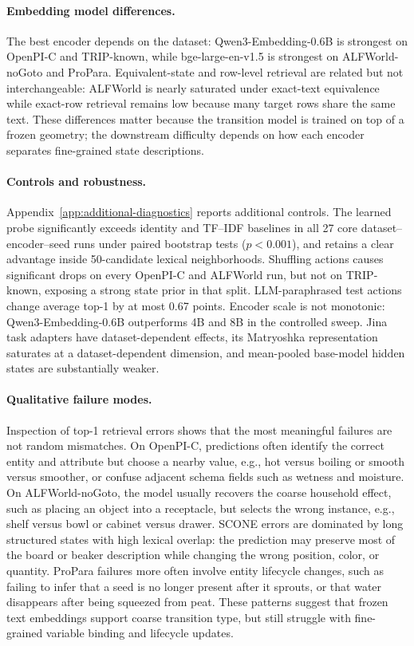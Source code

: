 \documentclass{article}
\begin{document}
\paragraph{Embedding model differences.}
The best encoder depends on the dataset: Qwen3-Embedding-0.6B is strongest on OpenPI-C and TRIP-known, while bge-large-en-v1.5 is strongest on ALFWorld-noGoto and ProPara. Equivalent-state and row-level retrieval are related but not interchangeable: ALFWorld is nearly saturated under exact-text equivalence while exact-row retrieval remains low because many target rows share the same text. These differences matter because the transition model is trained on top of a frozen geometry; the downstream difficulty depends on how each encoder separates fine-grained state descriptions.

\paragraph{Controls and robustness.}
Appendix~\ref{app:additional-diagnostics} reports additional controls. The learned probe significantly exceeds identity and TF--IDF baselines in all 27 core dataset--encoder--seed runs under paired bootstrap tests ($p<0.001$), and retains a clear advantage inside 50-candidate lexical neighborhoods. Shuffling actions causes significant drops on every OpenPI-C and ALFWorld run, but not on TRIP-known, exposing a strong state prior in that split. LLM-paraphrased test actions change average top-1 by at most 0.67 points. Encoder scale is not monotonic: Qwen3-Embedding-0.6B outperforms 4B and 8B in the controlled sweep. Jina task adapters have dataset-dependent effects, its Matryoshka representation saturates at a dataset-dependent dimension, and mean-pooled base-model hidden states are substantially weaker.

\paragraph{Qualitative failure modes.}
Inspection of top-1 retrieval errors shows that the most meaningful failures are not random mismatches. On OpenPI-C, predictions often identify the correct entity and attribute but choose a nearby value, e.g., hot versus boiling or smooth versus smoother, or confuse adjacent schema fields such as wetness and moisture. On ALFWorld-noGoto, the model usually recovers the coarse household effect, such as placing an object into a receptacle, but selects the wrong instance, e.g., shelf versus bowl or cabinet versus drawer. SCONE errors are dominated by long structured states with high lexical overlap: the prediction may preserve most of the board or beaker description while changing the wrong position, color, or quantity. ProPara failures more often involve entity lifecycle changes, such as failing to infer that a seed is no longer present after it sprouts, or that water disappears after being squeezed from peat. These patterns suggest that frozen text embeddings support coarse transition type, but still struggle with fine-grained variable binding and lifecycle updates.
\end{document}
